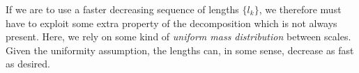 If we are to use a faster decreasing sequence of lengths $\{ l_k \}$, we therefore must have to exploit some extra property of the decomposition which is not always present. Here, we rely on some kind of \emph{uniform mass distribution} between scales. Given the uniformity assumption, the lengths can, in some sense, decrease as fast as desired.


